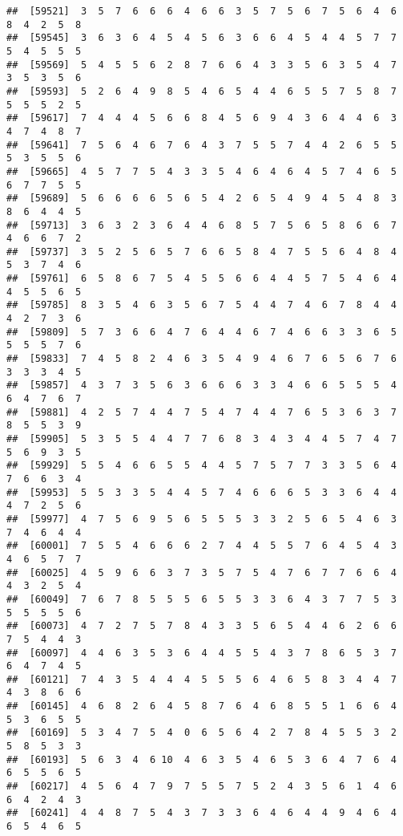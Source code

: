 \documentclass[
]{book}
\begin{document}
\begin{verbatim}
##  [59521]  3  5  7  6  6  6  4  6  6  3  5  7  5  6  7  5  6  4  6  8  4  2  5  8
##  [59545]  3  6  3  6  4  5  4  5  6  3  6  6  4  5  4  4  5  7  7  5  4  5  5  5
##  [59569]  5  4  5  5  6  2  8  7  6  6  4  3  3  5  6  3  5  4  7  3  5  3  5  6
##  [59593]  5  2  6  4  9  8  5  4  6  5  4  4  6  5  5  7  5  8  7  5  5  5  2  5
##  [59617]  7  4  4  4  5  6  6  8  4  5  6  9  4  3  6  4  4  6  3  4  7  4  8  7
##  [59641]  7  5  6  4  6  7  6  4  3  7  5  5  7  4  4  2  6  5  5  5  3  5  5  6
##  [59665]  4  5  7  7  5  4  3  3  5  4  6  4  6  4  5  7  4  6  5  6  7  7  5  5
##  [59689]  5  6  6  6  6  5  6  5  4  2  6  5  4  9  4  5  4  8  3  8  6  4  4  5
##  [59713]  3  6  3  2  3  6  4  4  6  8  5  7  5  6  5  8  6  6  7  4  6  6  7  2
##  [59737]  3  5  2  5  6  5  7  6  6  5  8  4  7  5  5  6  4  8  4  5  3  7  4  6
##  [59761]  6  5  8  6  7  5  4  5  5  6  6  4  4  5  7  5  4  6  4  4  5  5  6  5
##  [59785]  8  3  5  4  6  3  5  6  7  5  4  4  7  4  6  7  8  4  4  4  2  7  3  6
##  [59809]  5  7  3  6  6  4  7  6  4  4  6  7  4  6  6  3  3  6  5  5  5  5  7  6
##  [59833]  7  4  5  8  2  4  6  3  5  4  9  4  6  7  6  5  6  7  6  3  3  3  4  5
##  [59857]  4  3  7  3  5  6  3  6  6  6  3  3  4  6  6  5  5  5  4  6  4  7  6  7
##  [59881]  4  2  5  7  4  4  7  5  4  7  4  4  7  6  5  3  6  3  7  8  5  5  3  9
##  [59905]  5  3  5  5  4  4  7  7  6  8  3  4  3  4  4  5  7  4  7  5  6  9  3  5
##  [59929]  5  5  4  6  6  5  5  4  4  5  7  5  7  7  3  3  5  6  4  7  6  6  3  4
##  [59953]  5  5  3  3  5  4  4  5  7  4  6  6  6  5  3  3  6  4  4  4  7  2  5  6
##  [59977]  4  7  5  6  9  5  6  5  5  5  3  3  2  5  6  5  4  6  3  7  4  6  4  4
##  [60001]  7  5  5  4  6  6  6  2  7  4  4  5  5  7  6  4  5  4  3  4  6  5  7  7
##  [60025]  4  5  9  6  6  3  7  3  5  7  5  4  7  6  7  7  6  6  4  4  3  2  5  4
##  [60049]  7  6  7  8  5  5  5  6  5  5  3  3  6  4  3  7  7  5  3  5  5  5  5  6
##  [60073]  4  7  2  7  5  7  8  4  3  3  5  6  5  4  4  6  2  6  6  7  5  4  4  3
##  [60097]  4  4  6  3  5  3  6  4  4  5  5  4  3  7  8  6  5  3  7  6  4  7  4  5
##  [60121]  7  4  3  5  4  4  4  5  5  5  6  4  6  5  8  3  4  4  7  4  3  8  6  6
##  [60145]  4  6  8  2  6  4  5  8  7  6  4  6  8  5  5  1  6  6  4  5  3  6  5  5
##  [60169]  5  3  4  7  5  4  0  6  5  6  4  2  7  8  4  5  5  3  2  5  8  5  3  3
##  [60193]  5  6  3  4  6 10  4  6  3  5  4  6  5  3  6  4  7  6  4  6  5  5  6  5
##  [60217]  4  5  6  4  7  9  7  5  5  7  5  2  4  3  5  6  1  4  6  6  4  2  4  3
##  [60241]  4  4  8  7  5  4  3  7  3  3  6  4  6  4  4  9  4  6  4  6  5  4  6  5

\end{verbatim}
\end{document}
